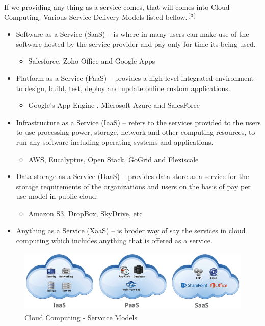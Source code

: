 \documentclass[12pt]{report}
\begin{document}
If we providing any thing as a service comes, that will comes into Cloud Computing. Various Service Delivery Models listed bellow.$ ^{[3]}$

\begin{itemize}
\item Software as a Service (SaaS) -- is where in many users can make use of the software hosted by the service provider and pay only for time its being used.
\begin{itemize}
	\item Salesforce, Zoho Office and Google Apps
\end{itemize}
\item Platform as a Service (PaaS) -- provides a high-level integrated environment to design, build, test, deploy and update online custom applications.
\begin{itemize}
	\item  Google’s App Engine , Microsoft Azure and SalesForce
\end{itemize}
\item Infrastructure as a Service (IaaS) -- refers to the services provided to the users to use processing power, storage, network and other computing resources, to run any software including operating systems and applications.
\begin{itemize}
	\item  AWS, Eucalyptus, Open Stack, GoGrid and Flexiscale
\end{itemize}

\item Data storage as a Service (DaaS) -- provides data store as a service for the storage requirements of the organizations and users on the basis of pay per use model in public cloud.
\begin{itemize}
	\item   Amazon S3, DropBox, SkyDrive, etc
\end{itemize}

\item Anything as a Service (XaaS) -- is broder way of say the services in cloud computing which includes anything that is offered as a service.

\end{itemize}

\begin{figure}[H]
 \centering
 \includegraphics[width=12cm,height=3cm]{./service.png}
 \caption{Cloud Computing - Servcice Models \label{fig:Cloud Computing - Servcice Models} }
\end{figure}
\end{document}
